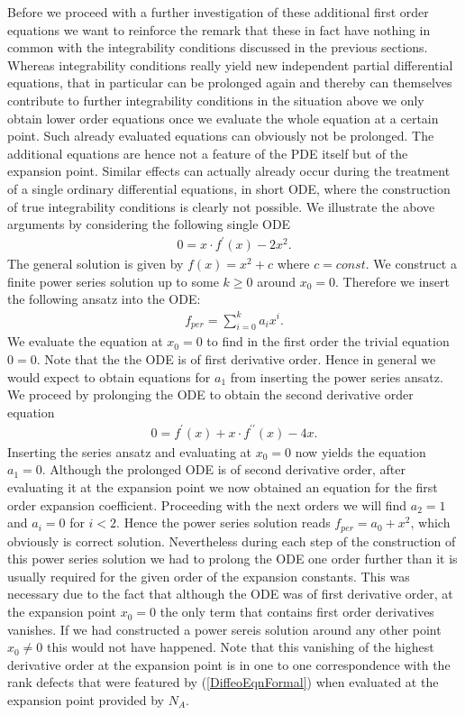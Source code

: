 \documentclass[a4paper,12pt, DIV=14, BCOR=5mm, twoside, headsepline]{scrbook}
\begin{document}
Before we proceed with a further investigation of these additional first order equations we want to reinforce the remark that these in fact have nothing in common with the integrability conditions discussed in the previous sections. Whereas integrability conditions really yield new independent partial differential equations, that in particular can be prolonged again and thereby can themselves contribute to further integrability conditions in the situation above we only obtain lower order equations once we evaluate the whole equation at a certain point. Such already evaluated equations can obviously not be prolonged. The additional equations are hence not a feature of the PDE itself but of the expansion point. Similar effects can actually already occur during the treatment of a single ordinary differential equations, in short ODE, where the construction of true integrability conditions is clearly not possible. We illustrate the above arguments by considering the following single ODE
\begin{align}
    0 = x \cdot f^{\prime}(x) - 2x^2.
\end{align}
The general solution is given by $f(x) = x^2 +c$ where $c=const$. We construct a finite power series solution up to some $k \geq 0$ around $x_0 = 0$. Therefore we insert the following ansatz into the ODE:
\begin{align}
    f_{per} = \sum_{i=0}^k a_i x^i.
\end{align}
We evaluate the equation at $x_0=0$ to find in the first order the trivial equation $0=0$. Note that the the ODE is of first derivative order. Hence in general we would expect to obtain equations for $a_1$ from inserting the power series ansatz. We proceed by prolonging the ODE to obtain the second derivative order equation
\begin{align}
    0 = f^{\prime}(x) + x \cdot f^{\prime \prime}(x) - 4 x.
\end{align}
Inserting the series ansatz and evaluating at $x_0=0$ now yields the equation $a_1=0$. Although the prolonged ODE is of second derivative order, after evaluating it at the expansion point we now obtained an equation for the first order expansion coefficient. Proceeding with the next orders we will find $a_2 = 1$ and $a_i = 0$ for $i < 2$. Hence the power series solution reads $f_{per} = a_0 + x^2$, which obviously is correct solution. Nevertheless during each  step of the construction of this power series solution we had to prolong the ODE one order further than it is usually required for the given order of the expansion constants. This was necessary due to the fact that although the ODE was of first derivative order, at the expansion point $x_0=0$ the only term that contains first order derivatives vanishes. If we had constructed a power sereis solution around any other point $x_0 \neq 0$ this would not have happened. Note that this vanishing of the highest derivative order at the expansion point is in one to one correspondence with the rank defects that were featured by (\ref{DiffeoEqnFormal}) when evaluated at the expansion point provided by $N_A$. \\
\end{document}
